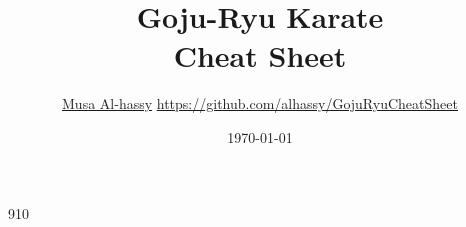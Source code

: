 \documentclass[11pt]{article}
\author{\href{http://www.cas.mcmaster.ca/\~alhassm/}{Musa Al-hassy} {\tiny\hspace{6em}\url{ https://github.com/alhassy/GojuRyuCheatSheet } }}
\date{\today}
\title{Goju-Ryu Karate\\\medskip
\large Cheat Sheet}
\def\maketitle#1{}
\begin{document}
\maketitle

\fontsize{9}{10}\selectfont

\theauthor \hfill \thedate
\hline
{\center \large\bf \thetitle \\ }




%
% 
\makeatletter
\renewcommand\section[1]{
  \@startsection {section}{1}{0ex}%
                 {-3.5ex \@plus -1ex \@minus -.2ex}%
                 {-1em}%
		 { \color{black}\normalfont\bfseries}* {\fbox{#1} \vspace{1ex}\newline }}
		 
\makeatother


\def\labelitemi{$\diamond$}
\def\labelitemii{$\circ$}
\def\labelitemiii{$\star$}

% 


\renewenvironment{parallel}[1][2] %
 {
  \setlength{\columnseprule}{2pt}
  \begin{minipage}[t]{\linewidth} %
  \begin{multicols}{#1}  %
 }
 { 
  \end{multicols}
  \end{minipage}
 }

\newenvironment{parallel3}
 {
  \setlength{\columnseprule}{2pt}
  \begin{minipage}[t]{\linewidth} %
  \begin{multicols}{3}
 }
 { 
  \end{multicols}
  \end{minipage}
 }
\end{document}
